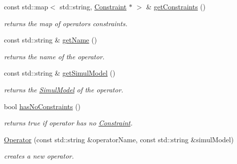 \begin{DoxyCompactItemize}
\item 
\mbox{\label{class_open_chams_1_1_operator_a0002889b395185948d7c71b261343620}} 
const std\+::map$<$ std\+::string, \mbox{\hyperlink{class_open_chams_1_1_operator_1_1_constraint}{Constraint}} $\ast$ $>$ \& \mbox{\hyperlink{class_open_chams_1_1_operator_a0002889b395185948d7c71b261343620}{get\+Constraints}} ()
\begin{DoxyCompactList}\small\item\em returns the map of operator\textquotesingle{}s constraints. \end{DoxyCompactList}\item 
\mbox{\label{class_open_chams_1_1_operator_a2858c0c4e8b5108f041237cf5a802029}} 
const std\+::string \& \mbox{\hyperlink{class_open_chams_1_1_operator_a2858c0c4e8b5108f041237cf5a802029}{get\+Name}} ()
\begin{DoxyCompactList}\small\item\em returns the name of the operator. \end{DoxyCompactList}\item 
\mbox{\label{class_open_chams_1_1_operator_aa189a1b119b44a8877c478e2d2357a89}} 
const std\+::string \& \mbox{\hyperlink{class_open_chams_1_1_operator_aa189a1b119b44a8877c478e2d2357a89}{get\+Simul\+Model}} ()
\begin{DoxyCompactList}\small\item\em returns the \mbox{\hyperlink{class_open_chams_1_1_simul_model}{Simul\+Model}} of the operator. \end{DoxyCompactList}\item 
\mbox{\label{class_open_chams_1_1_operator_a9ac68ad3e43b1649a8582c8685f4886d}} 
bool \mbox{\hyperlink{class_open_chams_1_1_operator_a9ac68ad3e43b1649a8582c8685f4886d}{has\+No\+Constraints}} ()
\begin{DoxyCompactList}\small\item\em returns true if operator has no \mbox{\hyperlink{class_open_chams_1_1_operator_1_1_constraint}{Constraint}}. \end{DoxyCompactList}\item 
\mbox{\hyperlink{class_open_chams_1_1_operator_a9e0a20318f4b2d91498f82b90504f2af}{Operator}} (const std\+::string \&operator\+Name, const std\+::string \&simul\+Model)
\begin{DoxyCompactList}\small\item\em creates a new operator. \end{DoxyCompactList}\end{DoxyCompactItemize}


